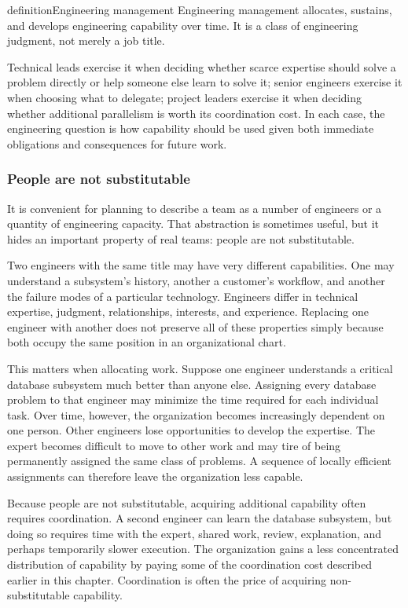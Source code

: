 \begin{bookbox}{definition}{Engineering management} %
Engineering management allocates, sustains, and develops engineering capability over time. It is a
class of engineering judgment, not merely a job title.

Technical leads exercise it when deciding whether scarce expertise should solve a problem directly
or help someone else learn to solve it; senior engineers exercise it when choosing what to delegate;
project leaders exercise it when deciding whether additional parallelism is worth its coordination
cost. In each case, the engineering question is how capability should be used given both immediate
obligations and consequences for future work.
\end{bookbox}

\subsubsection{People are not substitutable}\label{sec-people-not-substitutable}

It is convenient for planning to describe a team as a number of engineers or a quantity of
engineering capacity. That abstraction is sometimes useful, but it hides an important property of
real teams: people are not substitutable.

Two engineers with the same title may have very different capabilities. One may understand a
subsystem's history, another a customer's workflow, and another the failure modes of a particular
technology. Engineers differ in technical expertise, judgment, relationships, interests, and
experience. Replacing one engineer with another does not preserve all of these properties simply
because both occupy the same position in an organizational chart.

This matters when allocating work. Suppose one engineer understands a critical database subsystem
much better than anyone else. Assigning every database problem to that engineer may minimize the
time required for each individual task. Over time, however, the organization becomes increasingly
dependent on one person. Other engineers lose opportunities to develop the expertise. The expert
becomes difficult to move to other work and may tire of being permanently assigned the same class
of problems. A sequence of locally efficient assignments can therefore leave the organization less
capable.

Because people are not substitutable, acquiring additional capability often requires coordination.
A second engineer can learn the database subsystem, but doing so requires time with the expert,
shared work, review, explanation, and perhaps temporarily slower execution. The organization gains
a less concentrated distribution of capability by paying some of the coordination cost described
earlier in this chapter. Coordination is often the price of acquiring non-substitutable capability.

